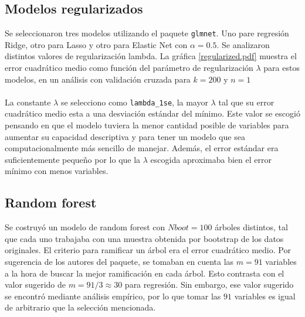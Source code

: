 \documentclass[11pt]{article}
\begin{document}
\subsection{Modelos regularizados}
Se seleccionaron tres modelos utilizando el paquete \texttt{glmnet}. Uno pare regresión Ridge, otro para Lasso y otro para Elastic Net con $\alpha=0.5$. Se analizaron distintos valores de regularización lambda. La gráfica \ref{regularized.pdf} muestra el error cuadrático medio como función del parámetro de regularización $\lambda$ para estos modelos, en un análisis con validación cruzada para $k=200$ y $n=1$
\\
\\La constante $\lambda$ se selecciono como \texttt{lambda\_1se}, la mayor $\lambda$  tal que su error cuadrático medio esta a una desviación estándar del mínimo. Este valor se escogió pensando en que el modelo tuviera la menor cantidad posible de variables para aumentar su capacidad descriptiva y para tener un modelo que sea computacionalmente más sencillo de manejar. Además, el error estándar era suficientemente pequeño por lo que la $\lambda$ escogida aproximaba bien el error mínimo con menos variables.
\subsection{Random forest}
Se costruyó un modelo de random forest con $Nboot=100$ árboles distintos, tal que cada uno trabajaba con una muestra obtenida por bootstrap de los datos originales. El criterio para ramificar un árbol era el error cuadrático medio. Por sugerencia de los autores del paquete, se tomaban en cuenta las $m = 91$ variables a la hora de buscar la mejor ramificación en cada árbol. Esto contrasta con el valor sugerido de $m=91/3 \approx 30$ para regresión. Sin embargo, ese valor sugerido se encontró mediante análisis empírico, por lo que tomar las $91$ variables es igual de arbitrario que la selección mencionada.
\end{document}
